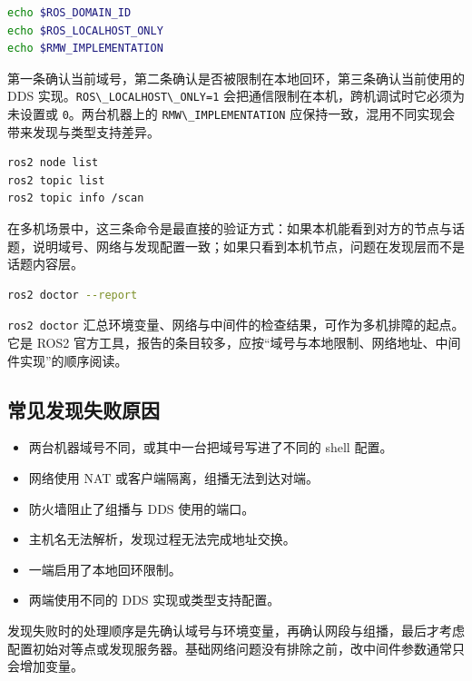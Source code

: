 \begin{lstlisting}[language=bash]
echo $ROS_DOMAIN_ID
echo $ROS_LOCALHOST_ONLY
echo $RMW_IMPLEMENTATION
\end{lstlisting}

第一条确认当前域号，第二条确认是否被限制在本地回环，第三条确认当前使用的
DDS 实现。\passthrough{\lstinline!ROS\_LOCALHOST\_ONLY=1!}
会把通信限制在本机，跨机调试时它必须为未设置或
\passthrough{\lstinline!0!}。两台机器上的
\passthrough{\lstinline!RMW\_IMPLEMENTATION!}
应保持一致，混用不同实现会带来发现与类型支持差异。

\begin{lstlisting}[language=bash]
ros2 node list
ros2 topic list
ros2 topic info /scan
\end{lstlisting}

在多机场景中，这三条命令是最直接的验证方式：如果本机能看到对方的节点与话题，说明域号、网络与发现配置一致；如果只看到本机节点，问题在发现层而不是话题内容层。

\begin{lstlisting}[language=bash]
ros2 doctor --report
\end{lstlisting}

\passthrough{\lstinline!ros2 doctor!}
汇总环境变量、网络与中间件的检查结果，可作为多机排障的起点。它是 ROS2
官方工具，报告的条目较多，应按``域号与本地限制、网络地址、中间件实现''的顺序阅读。

\subsection{常见发现失败原因}\label{ux5e38ux89c1ux53d1ux73b0ux5931ux8d25ux539fux56e0}

\begin{itemize}
\tightlist
\item
  两台机器域号不同，或其中一台把域号写进了不同的 shell 配置。
\item
  网络使用 NAT 或客户端隔离，组播无法到达对端。
\item
  防火墙阻止了组播与 DDS 使用的端口。
\item
  主机名无法解析，发现过程无法完成地址交换。
\item
  一端启用了本地回环限制。
\item
  两端使用不同的 DDS 实现或类型支持配置。
\end{itemize}

发现失败时的处理顺序是先确认域号与环境变量，再确认网段与组播，最后才考虑配置初始对等点或发现服务器。基础网络问题没有排除之前，改中间件参数通常只会增加变量。

